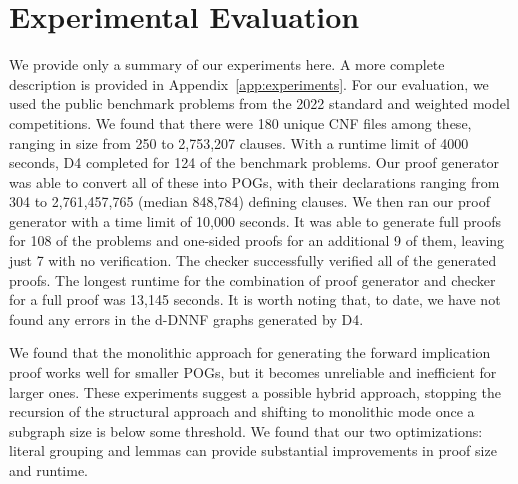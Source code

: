 \documentclass[letterpaper,USenglish,cleveref, autoref, thm-restate]{lipics-v2021}
\newcommand{\progname}[1]{\textsc{#1}}
\newcommand{\dfour}{\progname{D4}}
\begin{document}
\section{Experimental Evaluation}
\label{sect:experimental}


We provide only a summary of our experiments here.  A more complete
description is provided in Appendix~\ref{app:experiments}\@. For our
evaluation, we used the public benchmark problems from the 2022
standard and weighted model competitions.  We found that there were
180 unique CNF files among these, ranging in size from 250 to
2,753,207 clauses.
With a runtime limit of 4000 seconds, \dfour{} completed for 124 of the
benchmark problems.  Our proof generator was able to convert all of
these into POGs, with their declarations ranging from 304 to
2,761,457,765 (median 848,784) defining clauses.
We then ran our proof generator with a time limit of 10,000 seconds.
It was able to generate full proofs for 108 of the problems and
one-sided proofs for an additional 9 of them, leaving just 7 with no
verification.  The checker successfully verified all of the generated
proofs.  The longest runtime for the combination of proof generator
and checker for a full proof was 13,145 seconds.
It is worth noting that, to date, we have not found
any errors in the d-DNNF graphs generated by \dfour{}.

We found that the monolithic approach for generating the forward
implication proof works well for smaller POGs, but it becomes
unreliable and inefficient for larger ones.  These experiments suggest
a possible hybrid approach, stopping the recursion of the structural
approach and shifting to monolithic mode once a subgraph size is below some
threshold.  We found that our two optimizations: literal grouping and
lemmas can provide substantial improvements in proof size and runtime.
\end{document}
